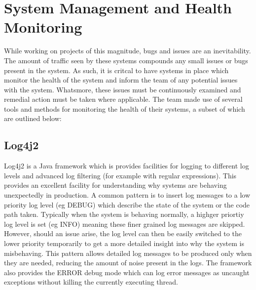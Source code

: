 \section{System Management and Health Monitoring}
While working on projects of this magnitude, bugs and issues are an inevitability. The amount of traffic seen by these systems compounds any small issues or bugs present in the system. As such, it is critcal to have systems in place which monitor the health of the system and inform the team of any potential issues with the system. Whatsmore, these issues must be continuously examined and remedial action must be taken where applicable. The \team{} team made use of several tools and methods for monitoring the health of their systems, a subset of which are outlined below:

\subsection{Log4j2}
Log4j2 \cite{log4j2} is a Java framework which is provides facilities for logging to different log levels and advanced log filtering (for example with regular expressions). This provides an excellent facility for understanding why systems are behaving unexpectedly in production. A common pattern is to insert log messages to a low priority log level (eg DEBUG) which describe the state of the system or the code path taken. Typically when the system is behaving normally, a highger priortiy log level is set (eg INFO) meaning these finer grained log messages are skipped. However, should an issue arise, the log level can then be easily switched to the lower priority temporarily to get a more detailed insight into why the system is misbehaving. This pattern allows detailed log messages to be produced only when they are needed, reducing the amount of noise present in the logs. The framework also provides the ERROR debug mode which can log error messages as uncaught exceptions without killing the currently executing thread.

